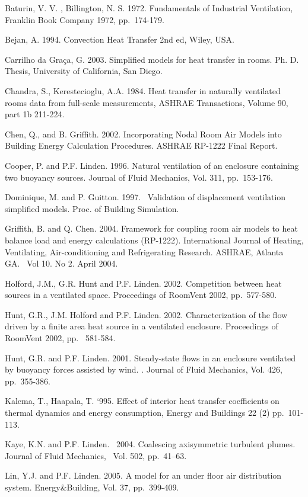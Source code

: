 {Baturin, V. V. , Billington, N. S. 1972. Fundamentals of Industrial Ventilation, Franklin Book Company 1972, pp.~174-179.

Bejan, A. 1994. Convection Heat Transfer 2nd ed, Wiley, USA.

Carrilho da Gra\c{c}a, G. 2003. Simplified models for heat transfer in rooms. Ph. D. Thesis, University of California, San Diego.

Chandra, S., Kerestecioglu, A.A. 1984. Heat transfer in naturally ventilated rooms data from full-scale measurements, ASHRAE Transactions, Volume 90, part 1b 211-224.

Chen, Q., and B. Griffith. 2002. Incorporating Nodal Room Air Models into Building Energy Calculation Procedures. ASHRAE RP-1222 Final Report.

Cooper, P. and P.F. Linden. 1996. Natural ventilation of an enclosure containing two buoyancy sources. Journal of Fluid Mechanics, Vol. 311, pp.~153-176.

Dominique, M. and P. Guitton. 1997.~ Validation of displacement ventilation simplified models. Proc. of Building Simulation.

Griffith, B. and Q. Chen. 2004. Framework for coupling room air models to heat balance load and energy calculations (RP-1222). International Journal of Heating, Ventilating, Air-conditioning and Refrigerating Research. ASHRAE, Atlanta GA.~ Vol 10. No 2. April 2004.

Holford, J.M., G.R. Hunt and P.F. Linden. 2002. Competition between heat sources in a ventilated space. Proceedings of RoomVent 2002, pp.~577-580.

Hunt, G.R., J.M. Holford and P.F. Linden. 2002. Characterization of the flow driven by a finite area heat source in a ventilated enclosure. Proceedings of RoomVent 2002, pp.~ 581-584.

Hunt, G.R. and P.F. Linden. 2001. Steady-state flows in an enclosure ventilated by buoyancy forces assisted by wind. . Journal of Fluid Mechanics, Vol. 426,~ pp.~355-386.

Kalema, T., Haapala, T. `995. Effect of interior heat transfer coefficients on thermal dynamics and energy consumption, Energy and Buildings 22 (2) pp.~101-113.

Kaye, K.N. and P.F. Linden.~ 2004. Coalescing axisymmetric turbulent plumes\emph{.} Journal of Fluid Mechanics, ~Vol. 502, pp.~41--63.

Lin, Y.J. and P.F. Linden. 2005. A model for an under floor air distribution system. Energy\&Building, Vol. 37, pp.~399-409.

}
